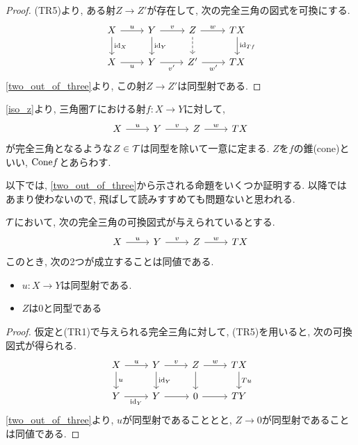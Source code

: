 \documentclass[uplatex, a4paper, 14Q, dvipdfmx]{jsarticle}
\begin{document}
\begin{proof}
  (TR5)より, ある射$Z \to Z'$が存在して, 次の完全三角の図式を可換にする. 
  \[\begin{tikzcd}
    X & Y & Z & TX \\
    {X} & {Y} & {Z'} & {TX}
    \arrow["u", from=1-1, to=1-2]
    \arrow["v", from=1-2, to=1-3]
    \arrow["w", from=1-3, to=1-4]
    \arrow["{\id_X}", from=1-1, to=2-1]
    \arrow["{\id_Y}", from=1-2, to=2-2]
    \arrow[dashed, from=1-3, to=2-3]
    \arrow["{\id_{Tf}}", from=1-4, to=2-4]
    \arrow["{u}"', from=2-1, to=2-2]
    \arrow["{v'}"', from=2-2, to=2-3]
    \arrow["{w'}"', from=2-3, to=2-4]
  \end{tikzcd}\] 
  \cref{two_out_of_three}より, この射$Z \to Z'$は同型射である. 
\end{proof}

\begin{definition}[錐] \label{cone}
  \cref{iso_z}より, 三角圏$\mathcal{T}$における射$f: X \to Y$に対して, 
  \[\begin{tikzcd}
    X & Y & Z & TX
    \arrow["u", from=1-1, to=1-2]
    \arrow["v", from=1-2, to=1-3]
    \arrow["w", from=1-3, to=1-4]
  \end{tikzcd}\]
  が完全三角となるような$Z \in \mathcal{T}$は同型を除いて一意に定まる. 
  $Z$を$f$の錐(cone)といい, $\mathrm{Cone} f$とあらわす. 
\end{definition}

以下では, \cref{two_out_of_three}から示される命題をいくつか証明する. 
以降ではあまり使わないので, 飛ばして読みすすめても問題ないと思われる. 

\begin{corollary}
  $\mathcal{T}$において, 次の完全三角の可換図式が与えられているとする. 
  \[\begin{tikzcd}
    X & Y & Z & TX
    \arrow["u", from=1-1, to=1-2]
    \arrow["v", from=1-2, to=1-3]
    \arrow["w", from=1-3, to=1-4]
  \end{tikzcd}\]
  このとき, 次の2つが成立することは同値である. 
  \begin{itemize}
    \item $u: X \to Y$は同型射である. 
    \item $Z$は$0$と同型である
  \end{itemize}
\end{corollary}

\begin{proof}
  仮定と(TR1)で与えられる完全三角に対して, (TR5)を用いると, 次の可換図式が得られる. 
  \[\begin{tikzcd}
    X & Y & Z & TX \\
    {Y} & {Y} & {0} & {TY}
    \arrow["u", from=1-1, to=1-2]
    \arrow["v", from=1-2, to=1-3]
    \arrow["w", from=1-3, to=1-4]
    \arrow["u", from=1-1, to=2-1]
    \arrow["{\id_Y}", from=1-2, to=2-2]
    \arrow[from=1-3, to=2-3]
    \arrow["{Tu}", from=1-4, to=2-4]
    \arrow["{\id_Y}"', from=2-1, to=2-2]
    \arrow[from=2-2, to=2-3]
    \arrow[from=2-3, to=2-4]
  \end{tikzcd}\] 
  \cref{two_out_of_three}より, $u$が同型射であることとと, $Z \to 0$が同型射であることは同値である. 
\end{proof}
\end{document}
